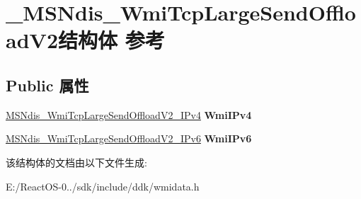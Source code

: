 \hypertarget{struct___m_s_ndis___wmi_tcp_large_send_offload_v2}{}\section{\+\_\+\+M\+S\+Ndis\+\_\+\+Wmi\+Tcp\+Large\+Send\+Offload\+V2结构体 参考}
\label{struct___m_s_ndis___wmi_tcp_large_send_offload_v2}
\subsection*{Public 属性}
\begin{DoxyCompactItemize}
\item 
\mbox{\label{struct___m_s_ndis___wmi_tcp_large_send_offload_v2_a1d3b5a4b404068d721371e82d571b5a6}} 
\hyperlink{struct___m_s_ndis___wmi_tcp_large_send_offload_v2___i_pv4}{M\+S\+Ndis\+\_\+\+Wmi\+Tcp\+Large\+Send\+Offload\+V2\+\_\+\+I\+Pv4} {\bfseries Wmi\+I\+Pv4}
\item 
\mbox{\label{struct___m_s_ndis___wmi_tcp_large_send_offload_v2_ab084f4a67ff279211ee488f58dd67484}} 
\hyperlink{struct___m_s_ndis___wmi_tcp_large_send_offload_v2___i_pv6}{M\+S\+Ndis\+\_\+\+Wmi\+Tcp\+Large\+Send\+Offload\+V2\+\_\+\+I\+Pv6} {\bfseries Wmi\+I\+Pv6}
\end{DoxyCompactItemize}


该结构体的文档由以下文件生成\+:\begin{DoxyCompactItemize}
\item 
E\+:/\+React\+O\+S-\/0../sdk/include/ddk/wmidata.\+h\end{DoxyCompactItemize}
